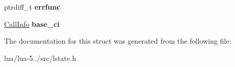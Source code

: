 \begin{DoxyCompactItemize}
\item 
\hypertarget{structlua___state_a09de3a7c6d3bcb6c2b0d26a81bb8d44b}{ptrdiff\+\_\+t {\bfseries errfunc}}\label{structlua___state_a09de3a7c6d3bcb6c2b0d26a81bb8d44b}

\item 
\hypertarget{structlua___state_a8c707493c7e45c7e0467381f5a80175d}{\hyperlink{struct_call_info}{Call\+Info} {\bfseries base\+\_\+ci}}\label{structlua___state_a8c707493c7e45c7e0467381f5a80175d}

\end{DoxyCompactItemize}


The documentation for this struct was generated from the following file\+:\begin{DoxyCompactItemize}
\item 
lua/lua-\/5../src/lstate.\+h\end{DoxyCompactItemize}
